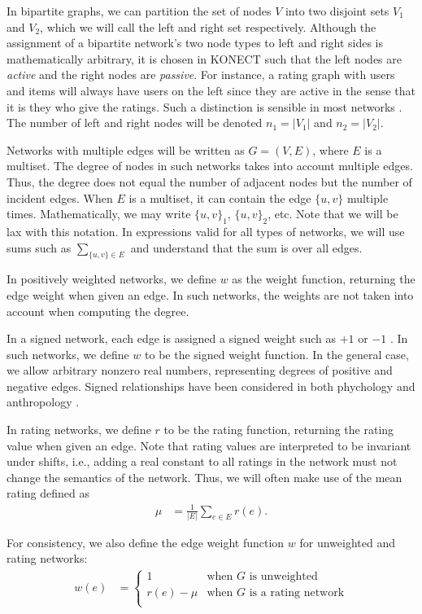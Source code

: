 \documentclass{article}
\begin{document}
In bipartite graphs, we can partition the set of nodes $V$ into two
disjoint sets $V_1$ and $V_2$, which we will call the left and right
set respectively.  Although the assignment of a bipartite network's two
node types to left and right sides is mathematically arbitrary, it is
chosen in KONECT such that the left nodes are \emph{active} and the
right nodes are \emph{passive}.  For instance, a rating graph with users
and items will always have users on the left since they are active in
the sense that it is they who give the ratings.  
Such a distinction is sensible in most networks \citep{b732}.
The number of left and
right nodes will be denoted $n_1 = |V_1|$ and $n_2 = |V_2|$. 

Networks with multiple edges will be written as $G=(V,E)$, where $E$ is
a multiset.  The degree of nodes in such networks takes into account
multiple edges. Thus, the degree does not equal the number of adjacent
nodes but the number of incident edges.  When $E$ is a multiset, it can
contain the edge $\{u,v\}$ multiple times.  Mathematically, we 
may write $\{u,v\}_1$, $\{u,v\}_2$, etc.  Note that we will be lax with
this notation.  In expressions valid for all types of networks, we will
use sums such as $\sum_{\{u,v\}\in E}$ and understand that the sum
is over all edges. 

In positively weighted networks, we define $w$ as the
weight function, returning the edge weight when given an edge. In such
networks, the weights are not taken into account when computing the
degree. 

In a signed network, each edge is assigned a signed weight such as $+1$
or $-1$ \citep{b647}.  In such networks, we define $w$ to be the signed weight
function.  In the general case, we allow arbitrary nonzero real numbers,
representing degrees of positive and negative edges.  Signed
relationships have been considered in both phychology \citep{b862} and
anthropology \citep{b323}.  

In rating networks, we define $r$ to be
the rating function, returning the rating value when given an edge.  Note
that rating values are interpreted to be invariant under shifts, i.e.,
adding a real constant to all ratings in the network must not
change the semantics of the network.  Thus, we will often make use of
the mean rating defined as
\begin{align}
  \mu &= \frac 1 {|E|} \sum_{e\in E} r(e). 
\end{align}

For consistency, we also
define the edge weight function $w$ for unweighted and rating networks: 
\begin{align}
  w(e) &= \left\{ \begin{array}{ll} 
    1 & \text{when $G$ is unweighted} \\
    r(e)-\mu & \text{when $G$ is a rating network} \\
    \end{array} \right. 
\end{align}
\end{document}
